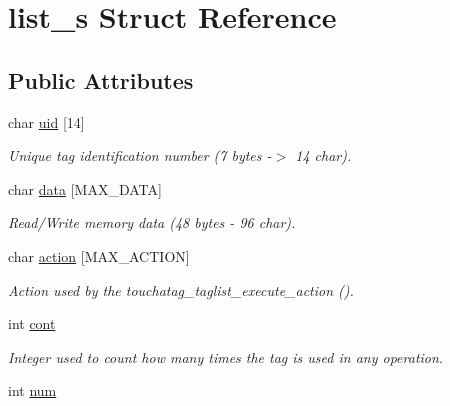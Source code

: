 \hypertarget{structlist__s}{
\section{list\_\-s Struct Reference}
\label{structlist__s}
}
\subsection*{Public Attributes}
\begin{DoxyCompactItemize}
\item 
\hypertarget{structlist__s_a198d92146c044dc0f7b83788ca9987f6}{
char \hyperlink{structlist__s_a198d92146c044dc0f7b83788ca9987f6}{uid} \mbox{[}14\mbox{]}}
\label{structlist__s_a198d92146c044dc0f7b83788ca9987f6}

\begin{DoxyCompactList}\small\item\em Unique tag identification number (7 bytes -\/$>$ 14 char). \item\end{DoxyCompactList}\item 
\hypertarget{structlist__s_a587dc91e9b1426e9a79fa5c47f51ff5e}{
char \hyperlink{structlist__s_a587dc91e9b1426e9a79fa5c47f51ff5e}{data} \mbox{[}MAX\_\-DATA\mbox{]}}
\label{structlist__s_a587dc91e9b1426e9a79fa5c47f51ff5e}

\begin{DoxyCompactList}\small\item\em Read/Write memory data (48 bytes -\/ 96 char). \item\end{DoxyCompactList}\item 
\hypertarget{structlist__s_a611b61610b819a39818cfabd447132f1}{
char \hyperlink{structlist__s_a611b61610b819a39818cfabd447132f1}{action} \mbox{[}MAX\_\-ACTION\mbox{]}}
\label{structlist__s_a611b61610b819a39818cfabd447132f1}

\begin{DoxyCompactList}\small\item\em Action used by the touchatag\_\-taglist\_\-execute\_\-action (). \item\end{DoxyCompactList}\item 
\hypertarget{structlist__s_a4acc518c276946f6da3a2134cb1dd810}{
int \hyperlink{structlist__s_a4acc518c276946f6da3a2134cb1dd810}{cont}}
\label{structlist__s_a4acc518c276946f6da3a2134cb1dd810}

\begin{DoxyCompactList}\small\item\em Integer used to count how many times the tag is used in any operation. \item\end{DoxyCompactList}\item 
\hypertarget{structlist__s_a6f5bf352a013122760a5672d8cc4bb15}{
int \hyperlink{structlist__s_a6f5bf352a013122760a5672d8cc4bb15}{num}}
\label{structlist__s_a6f5bf352a013122760a5672d8cc4bb15}


\end{DoxyCompactItemize}
